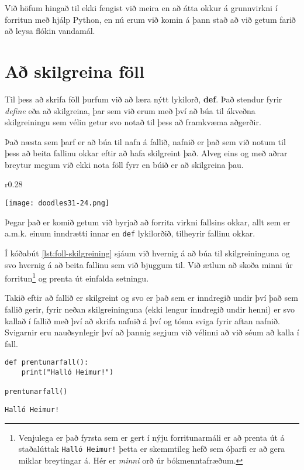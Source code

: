 Við höfum hingað til ekki fengist við meira en að átta okkur á grunnvirkni í forritun með hjálp Python, en nú erum við komin á þann stað að við getum farið að leysa flókin vandamál.


\section{Að skilgreina föll}
Til þess að skrifa föll þurfum við að læra nýtt lykilorð, \textbf{def}.
Það stendur fyrir \emph{define} eða að skilgreina, þar sem við erum með því að búa til ákveðna skilgreiningu sem vélin getur svo notað til þess að framkvæma aðgerðir.

Það næsta sem þarf er að búa til nafn á fallið, nafnið er það sem við notum til þess að beita fallinu okkar eftir að hafa skilgreint það.
Alveg eins og með aðrar breytur megum við ekki nota föll fyrr en búið er að skilgreina þau.


 \begin{wrapfigure}{r}{0.28\textwidth} %
	\begin{center}
		\texttt{[image: doodles31-24.png]}
	\end{center}
\end{wrapfigure}

Þegar það er komið getum við byrjað að forrita virkni fallsins okkar, allt sem er a.m.k. einum inndrætti innar en \texttt{def} lykilorðið, tilheyrir fallinu okkar.

Í kóðabút \ref{lst:foll-skilgreining} sjáum við hvernig á að búa til skilgreininguna og svo hvernig á að beita fallinu sem við bjuggum til.
Við ætlum að skoða minni úr forritun\footnote{Venjulega er það fyrsta sem er gert í nýju forritunarmáli er að prenta út á staðalúttak \texttt{Halló Heimur!} þetta er skemmtileg hefð sem óþarfi er að gera miklar breytingar á. Hér er \textit{minni} orð úr bókmenntafræðum.} og prenta út einfalda setningu.

Takið eftir að fallið er skilgreint og svo er það sem er inndregið undir því það sem fallið gerir, fyrir neðan skilgreininguna (ekki lengur inndregið undir henni) er svo kallað í fallið með því að skrifa nafnið á því og tóma sviga fyrir aftan nafnið.
Svigarnir eru nauðsynlegir því að þannig segjum við vélinni að við séum að kalla í fall.

\begin{lstlisting}[caption=Föll skilgreind, label=lst:foll-skilgreining]
def prentunarfall():
	print("Halló Heimur!")

prentunarfall()
\end{lstlisting}
\lstset{style=uttak}
\begin{lstlisting}
Halló Heimur!
\end{lstlisting}
\lstset{style=venjulegt}

